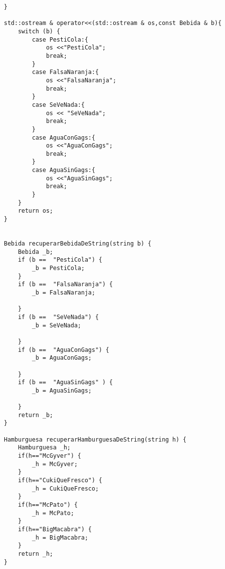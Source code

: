 \begin{lstlisting}
}

std::ostream & operator<<(std::ostream & os,const Bebida & b){
    switch (b) {
        case PestiCola:{
            os <<"PestiCola";
            break;
        }
        case FalsaNaranja:{
            os <<"FalsaNaranja";
            break;            
        }
        case SeVeNada:{
            os << "SeVeNada";
            break;
        }
        case AguaConGags:{
            os <<"AguaConGags";
            break;            
        }
        case AguaSinGags:{
            os <<"AguaSinGags";
            break;            
        }
    }
    return os;
}


Bebida recuperarBebidaDeString(string b) {
    Bebida _b;
    if (b ==  "PestiCola") { 
        _b = PestiCola;
    }
    if (b ==  "FalsaNaranja") { 
        _b = FalsaNaranja;
        
    }
    if (b ==  "SeVeNada") { 
        _b = SeVeNada;
        
    }
    if (b ==  "AguaConGags") { 
        _b = AguaConGags;
        
    }
    if (b ==  "AguaSinGags" ) { 
        _b = AguaSinGags;
        
    }
    return _b;
}

Hamburguesa recuperarHamburguesaDeString(string h) {
    Hamburguesa _h; 
    if(h=="McGyver") {
        _h = McGyver;
    }
    if(h=="CukiQueFresco") {
        _h = CukiQueFresco;
    }
    if(h=="McPato") {
        _h = McPato;
    }
    if(h=="BigMacabra") {
        _h = BigMacabra;
    }        
    return _h;
}
\end{lstlisting}